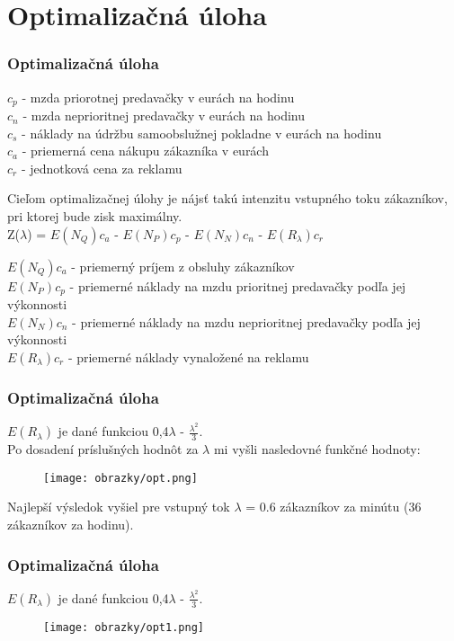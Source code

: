 \documentclass[hyperref={pdfpagelabels=false}]{beamer}
\begin{document}
\section{Optimalizačná úloha}
\begin{frame}
\frametitle{Optimalizačná úloha}
$c_p$ - mzda priorotnej predavačky v eurách na hodinu\\
$c_n$ - mzda neprioritnej predavačky v eurách na hodinu\\
$c_s$ - náklady na údržbu samoobslužnej pokladne v eurách na hodinu\\ 
$c_a$ - priemerná cena nákupu zákazníka v eurách\\
$c_r$ - jednotková cena za reklamu
\medskip \medskip

Cieľom optimalizačnej úlohy je nájsť takú intenzitu vstupného toku zákazníkov, pri ktorej bude zisk maximálny.\\

\medskip \medskip
Z($\lambda$) = $E(N_Q)c_a$ - $E(N_P)c_p$ - $E(N_N)c_n$ - $E(R_\lambda)c_r$

\medskip \medskip
$E(N_Q)c_a$ - priemerný príjem z obsluhy zákazníkov\\
$E(N_P)c_p$ - priemerné náklady na mzdu prioritnej predavačky podľa jej výkonnosti\\
$E(N_N)c_n$ - priemerné náklady na mzdu neprioritnej predavačky podľa jej výkonnosti\\
$E(R_\lambda)c_r$ - priemerné náklady vynaložené na reklamu
\end{frame}

\begin{frame}
\frametitle{Optimalizačná úloha}
$E(R_\lambda)$ je dané funkciou 0,4$\lambda$ - $\frac{\lambda^2}{3}$.\\
\medskip
Po dosadení príslušných hodnôt za $\lambda$ mi vyšli nasledovné funkčné hodnoty:
\begin{figure}[!hlrbt]
\begin{center}
\texttt{[image: obrazky/opt.png]}
\end{center}
\end{figure}
Najlepší výsledok vyšiel pre vstupný tok $\lambda$ = 0.6 zákazníkov za minútu (36 zákazníkov za hodinu).
\end{frame}

\begin{frame}
\frametitle{Optimalizačná úloha}
$E(R_\lambda)$ je dané funkciou 0,4$\lambda$ - $\frac{\lambda^2}{3}$.\\
\begin{figure}[!hlrbt]
\begin{center}
\texttt{[image: obrazky/opt1.png]}
\end{center}
\end{figure}
\end{frame}
\end{document}
